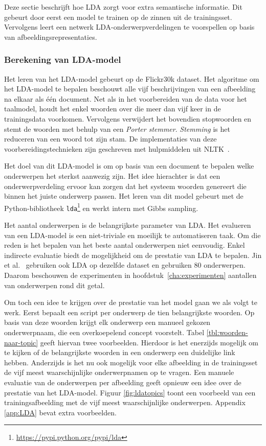 Deze sectie beschrijft hoe LDA zorgt voor extra semantische informatie. Dit gebeurt door eerst een model te trainen op de zinnen uit de trainingsset. Vervolgens leert een netwerk LDA-onderwerpverdelingen te voorspellen op basis van afbeeldingsrepresentaties.

\subsubsection{Berekening van LDA-model}
\label{subs:Berekening van onderwerpverdeling}
Het leren van het LDA-model gebeurt op de Flickr30k dataset. Het algoritme om het LDA-model te bepalen beschouwt alle vijf beschrijvingen van een afbeelding na elkaar als \'e\'en document. Net als in het voorbereiden van de data voor het taalmodel, houdt het enkel woorden over die meer dan vijf keer in de trainingsdata voorkomen. Vervolgens verwijdert het bovendien stopwoorden en stemt de woorden met behulp van een \emph{Porter stemmer}. \emph{Stemming} is het reduceren van een woord tot zijn stam. De implementaties van deze voorbereidingstechnieken zijn geschreven met hulpmiddelen uit NLTK~\cite{bird2009natural}.

Het doel van dit LDA-model is om op basis van een document te bepalen welke onderwerpen het sterkst aanwezig zijn. Het idee hierachter is dat een onderwerpverdeling ervoor kan zorgen dat het systeem woorden genereert die binnen het juiste onderwerp passen. Het leren van dit model gebeurt met de Python-bibliotheek \texttt{lda}\footnote{\url{https://pypi.python.org/pypi/lda}} en werkt intern met Gibbs sampling.

Het aantal onderwerpen is de belangrijkste parameter van LDA. Het evalueren van een LDA-model is een niet-triviale en moeilijk te automatiseren taak. Om die reden is het bepalen van het beste aantal onderwerpen niet eenvoudig. Enkel indirecte evaluatie biedt de mogelijkheid om de prestatie van LDA te bepalen. Jin et al.~\cite{Jin2015} gebruiken ook LDA op dezelfde dataset en gebruiken 80 onderwerpen. Daarom beschouwen de experimenten in hoofdstuk~\ref{cha:experimenten} aantallen van onderwerpen rond dit getal. 

Om toch een idee te krijgen over de prestatie van het model gaan we als volgt te werk. Eerst bepaalt een script per onderwerp de tien belangrijkste woorden. Op basis van deze woorden krijgt elk onderwerp een manueel gekozen onderwerpnaam, die een overkoepelend concept voorstelt. Tabel \ref{tbl:woorden-naar-topic} geeft hiervan twee voorbeelden. 
Hierdoor is het enerzijds mogelijk om te kijken of de belangrijkste woorden in een onderwerp een duidelijke link hebben. Anderzijds is het nu ook mogelijk voor elke afbeelding in de trainingsset de vijf meest waarschijnlijke onderwerpnamen op te vragen. Een manuele evaluatie van de onderwerpen per afbeelding geeft opnieuw een idee over de prestatie van het LDA-model. Figuur \ref{fig:ldatopics} toont een voorbeeld van een trainingsafbeelding met de vijf meest waarschijnlijke onderwerpen. Appendix \ref{app:LDA} bevat extra voorbeelden.

